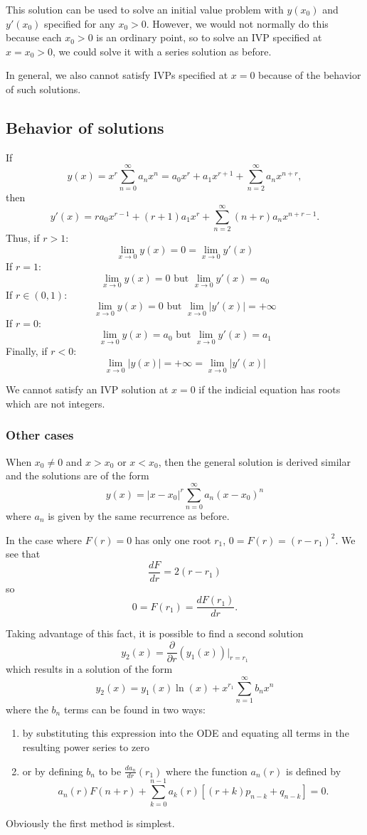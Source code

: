 \documentclass[11pt]{article}
\newcommand{\sumseries}{\sum_{n=0}^{\infty}}
\newcommand{\sumseriesone}{\sum_{n=1}^{\infty}}
\newcommand{\sumseriestwo}{\sum_{n=2}^{\infty}}
\newcommand{\powerser}{(x - x_0)^n}
\begin{document}
	This solution can be used to solve an initial value problem with $y(x_0)$ and $y'(x_0)$ specified for any $x_0 > 0$. However, we would not normally do this because each $x_0 > 0$ is an ordinary point, so to solve an IVP specified at $x = x_0 > 0$, we could solve it with a series solution as before.

	In general, we also cannot satisfy IVPs specified at $x=0$ because of the behavior of such solutions.

\subsection{Behavior of solutions}
	If
		$$ y(x) = x^r \sumseries a_n x^n = a_0 x^r + a_1 x^{r+1} + \sumseriestwo a_n x^{n+r}, $$
	then
		$$ y'(x) = r a_0 x^{r-1} + (r+1) a_1 x^r + \sumseriestwo (n+r) a_n x^{n+r-1}. $$
	Thus, if $r>1$:
		$$ \lim_{x \to 0} y(x) = 0 = \lim_{x \to 0} y'(x) $$
	If $r=1$:
		$$ \lim_{x \to 0} y(x) = 0 \text{ but } \lim_{x \to 0} y'(x) = a_0 $$
	If $r \in (0,1)$:
		$$ \lim_{x \to 0} y(x) = 0 \text{ but } \lim_{x \to 0} |y'(x)| = + \infty $$
	If $r = 0$:
		$$ \lim_{x \to 0} y(x) = a_0 \text{ but } \lim_{x \to 0}  y'(x) = a_1 $$
	Finally, if $r < 0$:
		$$ \lim_{x \to 0} |y(x)| = + \infty = \lim_{x \to 0} |y'(x)| $$

	We cannot satisfy an IVP solution at $x=0$ if the indicial equation has roots which are not integers.

\subsubsection{Other cases}
	When $x_0 \neq 0$ and $x > x_0$ or $x < x_0$, then the general solution is derived similar and the solutions are of the form
		$$ y(x) = |x-x_0|^r \sumseries a_n \powerser $$
	where $a_n$ is given by the same recurrence as before.

	In the case where $F(r) = 0$ has only one root $r_1$, $0 = F(r) = (r - r_1)^2$. We see that
		$$ \frac{dF}{dr} = 2 (r - r_1) $$
	so
		$$ 0 = F(r_1) = \frac{dF(r_1)}{dr} .$$

	Taking advantage of this fact, it is possible to find a second solution
		$$ y_2 (x) = \frac{\partial}{\partial r} (y_1 (x)) \Big|_{r=r_1} $$
	which results in a solution of the form
		$$ y_2 (x) = y_1 (x) \ln (x) + x^{r_1} \sumseriesone b_n x^n $$
	where the $b_n$ terms can be found in two ways:
		\begin{enumerate}
			\item by substituting this expression into the ODE and equating all terms in the resulting power series to zero
			\item or by defining $b_n$ to be $\frac{da_n}{dr} (r_1)$ where the function $a_n(r)$ is defined by
				$$ a_n (r) F(n+r) + \sum_{k=0}^{n-1} a_k (r) [(r+k) p_{n-k} + q_{n-k}] = 0 .$$
		\end{enumerate}
	Obviously the first method is simplest.
\end{document}
